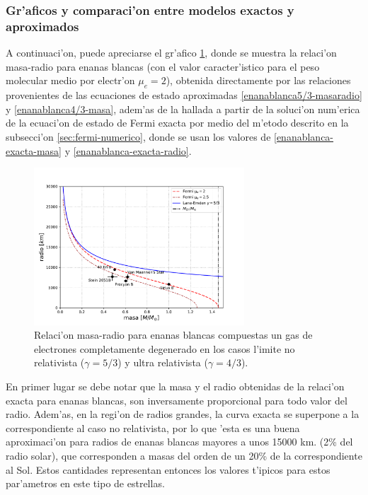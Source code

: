 \subsubsection{Gr'aficos y comparaci'on entre modelos exactos y aproximados}
A continuaci'on, puede apreciarse el gr'afico \ref{graficomasa-radio}, donde se muestra la relaci'on masa-radio para enanas blancas (con el valor caracter'istico para el peso molecular medio por electr'on $\mu_e=2$), obtenida directamente por las relaciones provenientes de las ecuaciones de estado aproximadas \eqref{enanablanca5/3-masaradio} y \eqref{enanablanca4/3-masa}, adem'as de la hallada a partir de la soluci'on num'erica de la ecuaci'on de estado de Fermi exacta por medio del m'etodo descrito en la subsecci'on \ref{sec:fermi-numerico}, donde se usan los valores de \eqref{enanablanca-exacta-masa} y \eqref{enanablanca-exacta-radio}.

\begin{figure}[H]
\centering
\includegraphics[angle=0,width=0.7\textwidth]{fig/fig-fermielectron-masa-radio.pdf}
\caption{Relaci'on masa-radio para enanas blancas compuestas un gas de electrones completamente degenerado en los casos l'imite no relativista ($\gamma=5/3$) y ultra relativista ($\gamma=4/3$).}\label{graficomasa-radio}
\end{figure}

En primer lugar se debe notar que la masa y el radio obtenidas de la relaci'on exacta para enanas blancas, son inversamente proporcional para todo valor del radio. Adem'as, en la regi'on de radios grandes, la curva exacta se superpone a la correspondiente al caso no relativista, por lo que 'esta es una buena aproximaci'on para radios de enanas blancas mayores a unos 15000 km. (2\% del radio solar), que corresponden a masas del orden de un 20\% de la correspondiente al Sol. Estos cantidades representan entonces los valores t'ipicos para estos par'ametros en este tipo de estrellas.

